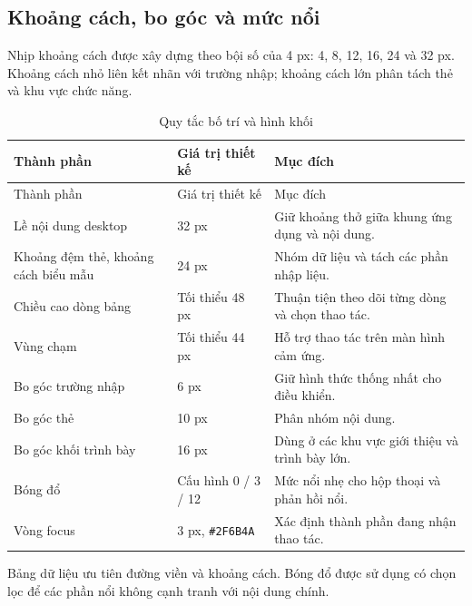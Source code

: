 \subsection{Khoảng cách, bo góc và mức nổi}
Nhịp khoảng cách được xây dựng theo bội số của 4 px: 4, 8, 12, 16, 24 và 32 px. Khoảng cách nhỏ liên kết nhãn với trường nhập; khoảng cách lớn phân tách thẻ và khu vực chức năng.
\begin{smalltable}\begin{longtable}{L{4.2cm}L{3.3cm}L{6.8cm}}
\caption{Quy tắc bố trí và hình khối}\\\toprule Thành phần & Giá trị thiết kế & Mục đích\\\midrule\endfirsthead
\toprule Thành phần & Giá trị thiết kế & Mục đích\\\midrule\endhead
Lề nội dung desktop & 32 px & Giữ khoảng thở giữa khung ứng dụng và nội dung.\\
Khoảng đệm thẻ, khoảng cách biểu mẫu & 24 px & Nhóm dữ liệu và tách các phần nhập liệu.\\
Chiều cao dòng bảng & Tối thiểu 48 px & Thuận tiện theo dõi từng dòng và chọn thao tác.\\
Vùng chạm & Tối thiểu 44 px & Hỗ trợ thao tác trên màn hình cảm ứng.\\
Bo góc trường nhập & 6 px & Giữ hình thức thống nhất cho điều khiển.\\
Bo góc thẻ & 10 px & Phân nhóm nội dung.\\
Bo góc khối trình bày & 16 px & Dùng ở các khu vực giới thiệu và trình bày lớn.\\
Bóng đổ & Cấu hình 0 / 3 / 12 & Mức nổi nhẹ cho hộp thoại và phản hồi nổi.\\
Vòng focus & 3 px, \texttt{\#2F6B4A} & Xác định thành phần đang nhận thao tác.\\\bottomrule
\end{longtable}\end{smalltable}
Bảng dữ liệu ưu tiên đường viền và khoảng cách. Bóng đổ được sử dụng có chọn lọc để các phần nổi không cạnh tranh với nội dung chính.

